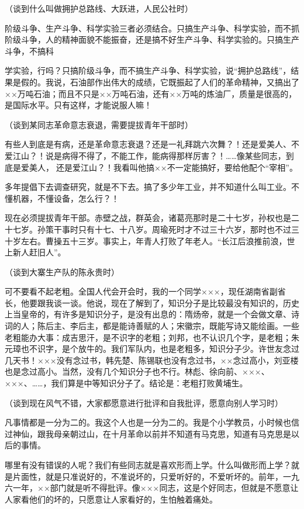 （谈到什么叫做拥护总路线、大跃进，人民公社时）

阶级斗争、生产斗争、科学实验三者必须结合。只搞生产斗争、科学实验，而不抓阶级斗争，人的精神面貌不能振奋，还是搞不好生产斗争、科学实验的。只搞生产斗争，不搞科

学实验，行吗？只搞阶级斗争，而不搞生产斗争、科学实验，说“拥护总路线”，结果是假的。我说，石油部作出伟大的成绩，它既振起了人们的革命精神，又搞出了××万吨石油；而且不只是××万吨石油，还有××万吨的炼油厂，质量是很高的，是国际水平。只有这样，才能说服人嘛！

（谈到某同志革命意志衰退，需要提拔青年干部时）

有些人到底是有病，还是革命意志衰退？还是一礼拜跳六次舞？！还是爱美人、不爱江山？！说是病得不得了，不能工作，能病得那样厉害？！……像某些同志，到底是爱美人，还是爱江山？！我看叫他搞××不一定能搞好，要给他配个“宰相”。

多年提倡下去调查研究，就是不下去。搞了多少年工业，并不知道什么叫工业。不懂机器，不懂设备，怎么行？！

现在必须提拔青年干部。赤壁之战，群英会，诸葛亮那时是二十七岁，孙权也是二十七岁。孙策干事时只有十七、十八岁。周瑜死时才不过三十六岁，那时也不过三十岁左右。曹操五十三岁。事实上，年青人打败了年老人。“长江后浪推前浪，世上新人赶旧人”。

（谈到大寨生产队的陈永贵时）

可不要看不起老粗。全国人代会开会时，我的一个同学×××，现任湖南省副省长，他要跟我谈一谈。他说，现在了解到了，知识分子是比较最没有知识的，历史上当皇帝的，有许多是知识分子，是没有出息的：隋炀帝，就是一个会做文章、诗词的人；陈后主、李后主，都是能诗善赋的人；宋徽宗，既能写诗又能绘画。一些老粗能办大事：成吉思汗，是不识字的老粗；刘邦，也不认识几个字，是老粗；朱元璋也不识字，是个放牛的。我们军队内，也是老粗多，知识分子少。许世友念过几天书！×××没有念过书，韩先楚、陈锡联也没有念过书，××念过高小，刘亚楼也是念过高小。当然，没有几个知识分子也不行。林彪、徐向前、×××、×××、……，我们算是中等知识分子了。结论是：老粗打败黄埔生。

（谈到现在风气不错，大家都愿意进行批评和自我批评，愿意向别人学习时）

凡事情都是一分为二的。我这个人也是一分为二的。我是个小学教员，小时候也信过神仙，跟我母亲朝过山，在十月革命以前并不知道有马克思，知道有马克思是以后的事情。

哪里有没有错误的人呢？我们有些同志就是喜欢形而上学。什么叫做形而上学？就是片面性，就是只准说好的，不准说坏的，只爱听好的，不爱听坏的。前年，一九六一年，××部门就是听不得批评。像×××同志，这是个好同志，但就是不愿意让人家看他们的坏的，只愿意让人家看好的，生怕触着痛处。

